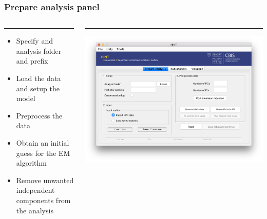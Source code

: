 \documentclass[11pt]{beamer}
\begin{document}
\begin{frame}
\frametitle{Prepare analysis panel}
\begin{columns}[T] %
	\begin{column}{.48\textwidth}
		\color{red}\rule{\linewidth}{0pt}
		
		\begin{itemize}
\item Specify and analysis folder and prefix
\item Load the data and setup the model
\item Preprocess the data
\item Obtain an initial guess for the EM algorithm
\item Remove unwanted independent components from the analysis
\end{itemize}
		
	\end{column}%
	\hfill%
	\begin{column}{.51\textwidth}
		\color{blue}\rule{\linewidth}{0pt}
		\includegraphics[width=1.2\linewidth]{figs/panel1empty}
	\end{column}%
\end{columns}
\end{frame}

\end{document}
